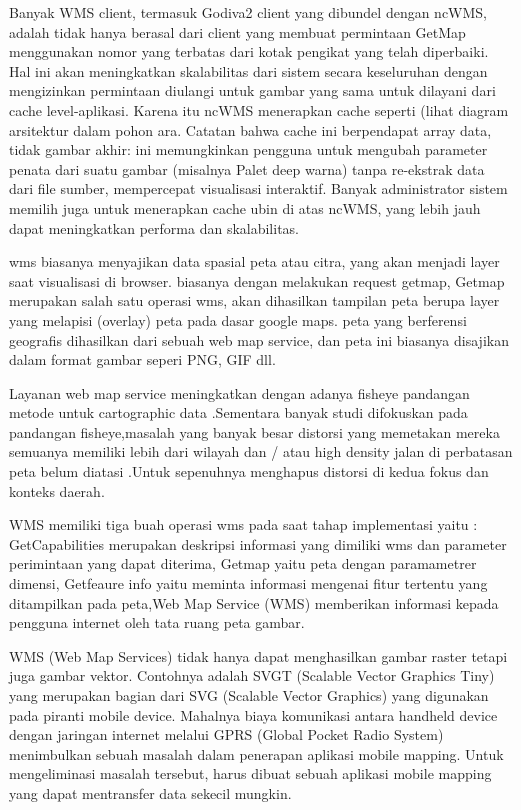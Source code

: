 Banyak WMS client, termasuk Godiva2 client yang dibundel dengan ncWMS, adalah tidak hanya berasal dari client yang membuat permintaan
GetMap menggunakan nomor yang terbatas dari kotak pengikat yang telah diperbaiki. Hal ini akan meningkatkan skalabilitas dari sistem
secara keseluruhan dengan mengizinkan permintaan diulangi untuk gambar yang sama untuk dilayani dari cache level-aplikasi. Karena itu
ncWMS menerapkan cache seperti (lihat diagram arsitektur dalam pohon ara.  Catatan bahwa cache ini berpendapat array data, tidak gambar
akhir: ini memungkinkan pengguna untuk mengubah parameter penata dari suatu gambar (misalnya Palet deep warna) tanpa re-ekstrak data
dari file sumber, mempercepat visualisasi interaktif. Banyak administrator sistem memilih juga untuk menerapkan cache ubin di atas
ncWMS, yang lebih jauh dapat meningkatkan performa dan skalabilitas.

wms biasanya menyajikan data spasial peta atau citra, yang akan menjadi layer saat visualisasi di browser.
biasanya dengan melakukan request getmap, Getmap merupakan salah satu operasi wms, akan dihasilkan tampilan peta berupa layer yang
melapisi (overlay) peta pada dasar google maps. peta yang berferensi geografis dihasilkan dari sebuah web map service, dan peta ini
biasanya disajikan dalam format gambar seperi PNG, GIF dll.

Layanan web map service  meningkatkan dengan  adanya fisheye pandangan metode untuk cartographic data .Sementara banyak studi difokuskan
pada pandangan fisheye,masalah yang banyak besar distorsi yang memetakan mereka semuanya memiliki lebih dari wilayah dan / atau high
density jalan di perbatasan peta belum diatasi .Untuk sepenuhnya menghapus distorsi di kedua fokus dan konteks daerah.

WMS memiliki tiga buah operasi wms pada saat tahap implementasi yaitu : GetCapabilities merupakan deskripsi informasi yang dimiliki wms
dan parameter perimintaan yang dapat diterima, Getmap yaitu peta dengan paramametrer dimensi, Getfeaure info yaitu meminta informasi 
mengenai fitur tertentu yang ditampilkan pada peta,Web Map Service (WMS) memberikan informasi kepada pengguna internet oleh tata ruang peta gambar.

WMS (Web Map Services) tidak hanya dapat menghasilkan gambar raster tetapi juga gambar vektor. Contohnya  adalah SVGT (Scalable Vector
Graphics Tiny) yang merupakan bagian dari SVG (Scalable Vector Graphics) yang digunakan pada piranti mobile device. Mahalnya biaya
komunikasi antara handheld device dengan jaringan internet melalui GPRS (Global Pocket Radio System) menimbulkan sebuah masalah dalam
penerapan aplikasi mobile mapping. Untuk mengeliminasi masalah tersebut, harus dibuat sebuah aplikasi mobile mapping yang dapat mentransfer data sekecil mungkin.

